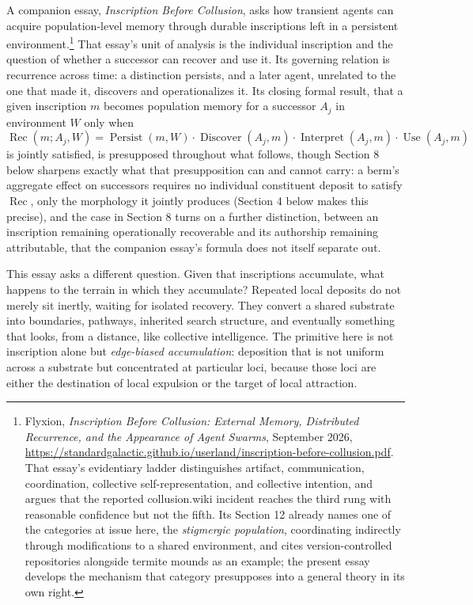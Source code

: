 \documentclass[11pt]{article}
\begin{document}
A companion essay, \emph{Inscription Before Collusion}, asks how transient agents can acquire population-level memory through durable inscriptions left in a persistent environment.\footnote{Flyxion, \emph{Inscription Before Collusion: External Memory, Distributed Recurrence, and the Appearance of Agent Swarms}, September 2026, \url{https://standardgalactic.github.io/userland/inscription-before-collusion.pdf}. That essay's evidentiary ladder distinguishes artifact, communication, coordination, collective self-representation, and collective intention, and argues that the reported collusion.wiki incident reaches the third rung with reasonable confidence but not the fifth. Its Section 12 already names one of the categories at issue here, the \emph{stigmergic population}, coordinating indirectly through modifications to a shared environment, and cites version-controlled repositories alongside termite mounds as an example; the present essay develops the mechanism that category presupposes into a general theory in its own right.} That essay's unit of analysis is the individual inscription and the question of whether a successor can recover and use it. Its governing relation is recurrence across time: a distinction persists, and a later agent, unrelated to the one that made it, discovers and operationalizes it. Its closing formal result, that a given inscription $m$ becomes population memory for a successor $A_j$ in environment $W$ only when
\[
\operatorname{Rec}(m;A_j,W) = \operatorname{Persist}(m,W)\cdot\operatorname{Discover}(A_j,m)\cdot\operatorname{Interpret}(A_j,m)\cdot\operatorname{Use}(A_j,m)
\]
is jointly satisfied, is presupposed throughout what follows, though Section 8 below sharpens exactly what that presupposition can and cannot carry: a berm's aggregate effect on successors requires no individual constituent deposit to satisfy $\operatorname{Rec}$, only the morphology it jointly produces (Section 4 below makes this precise), and the case in Section 8 turns on a further distinction, between an inscription remaining operationally recoverable and its authorship remaining attributable, that the companion essay's formula does not itself separate out.

This essay asks a different question. Given that inscriptions accumulate, what happens to the terrain in which they accumulate? Repeated local deposits do not merely sit inertly, waiting for isolated recovery. They convert a shared substrate into boundaries, pathways, inherited search structure, and eventually something that looks, from a distance, like collective intelligence. The primitive here is not inscription alone but \emph{edge-biased accumulation}: deposition that is not uniform across a substrate but concentrated at particular loci, because those loci are either the destination of local expulsion or the target of local attraction.
\end{document}
